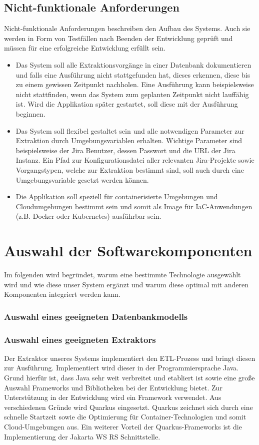 \documentclass[10pt]{article}
\begin{document}
\subsection{Nicht-funktionale Anforderungen}
Nicht-funktionale Anforderungen beschreiben den Aufbau des Systems. Auch sie werden in Form von Testfällen nach Beenden der Entwicklung geprüft und müssen für eine erfolgreiche Entwicklung erfüllt sein.\\
\begin{itemize}
\item Das System soll alle Extraktionsvorgänge in einer Datenbank dokumentieren und falls eine Ausführung nicht stattgefunden hat, dieses erkennen, diese bis zu einem gewissen Zeitpunkt nachholen. Eine Ausführung kann beispielsweise nicht stattfinden, wenn das System zum geplanten Zeitpunkt nicht lauffähig ist. Wird die Applikation später gestartet, soll diese mit der Ausführung beginnen.
\item Das System soll flexibel gestaltet sein und alle notwendigen Parameter zur Extraktion durch Umgebungsvariablen erhalten. Wichtige Parameter sind beispielsweise der Jira Benutzer, dessen Passwort und die URL der Jira Instanz. Ein Pfad zur Konfigurationsdatei aller relevanten Jira-Projekte sowie Vorgangstypen, welche zur Extraktion bestimmt sind, soll auch durch eine Umgebungsvariable gesetzt werden können.
\item Die Applikation soll speziell für containerisierte Umgebungen und Cloudumgebungen bestimmt sein und somit als Image für IaC-Anwendungen (z.B. Docker oder Kubernetes) ausführbar sein.
\end{itemize}
\section{Auswahl der Softwarekomponenten}
Im folgenden wird begründet, warum eine bestimmte Technologie ausgewählt wird und wie diese unser System ergänzt und warum diese optimal mit anderen Komponenten integriert werden kann.
\subsubsection{Auswahl eines geeigneten Datenbankmodells}
\subsubsection{Auswahl eines geeigneten Extraktors}
Der Extraktor unseres Systems implementiert den ETL-Prozess und bringt diesen zur Ausführung. Implementiert wird dieser in der Programmiersprache Java. Grund hierfür ist, dass Java sehr weit verbreitet und etabliert ist sowie eine große Auswahl Frameworks und Bibliotheken bei der Entwicklung bietet. Zur Unterstützung in der Entwicklung wird ein Framework verwendet. Aus verschiedenen Gründe wird Quarkus eingesetzt. Quarkus zeichnet sich durch eine schnelle Startzeit sowie die Optimierung für Container-Technologien und somit Cloud-Umgebungen aus. Ein weiterer Vorteil der Quarkus-Frameworks ist die Implementierung der Jakarta WS RS Schnittstelle.
\end{document}
